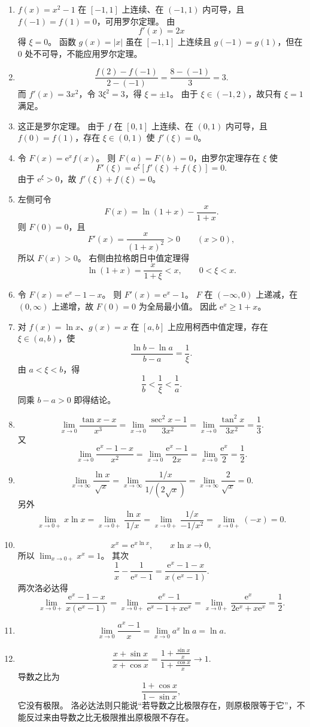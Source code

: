 \documentclass[fontset=fandol]{ctexart}
\newcommand{\ee}{\mathrm{e}}
\begin{document}
\begin{enumerate}[label=\textbf{练习\arabic*.},leftmargin=2.2em]
\item $f(x)=x^2-1$ 在 $[-1,1]$ 上连续、在 $(-1,1)$ 内可导，且 $f(-1)=f(1)=0$，可用罗尔定理。 由
\[
f'(x)=2x
\]
得 $\xi=0$。 函数 $g(x)=|x|$ 虽在 $[-1,1]$ 上连续且 $g(-1)=g(1)$，但在 $0$ 处不可导，不能应用罗尔定理。
\item
\[
\frac{f(2)-f(-1)}{2-(-1)}=\frac{8-(-1)}{3}=3.
\]
而 $f'(x)=3x^2$，令 $3\xi^2=3$，得 $\xi=\pm1$。 由于 $\xi\in(-1,2)$，故只有 $\xi=1$ 满足。
\item 这正是罗尔定理。 由于 $f$ 在 $[0,1]$ 上连续、在 $(0,1)$ 内可导，且 $f(0)=f(1)$，存在 $\xi\in(0,1)$ 使 $f'(\xi)=0$。
\item 令 $F(x)=\ee^x f(x)$。 则 $F(a)=F(b)=0$，由罗尔定理存在 $\xi$ 使
\[
F'(\xi)=\ee^\xi[f'(\xi)+f(\xi)]=0.
\]
由于 $\ee^\xi>0$，故 $f'(\xi)+f(\xi)=0$。
\item 左侧可令
\[
F(x)=\ln(1+x)-\frac{x}{1+x}.
\]
则 $F(0)=0$，且
\[
F'(x)=\frac{x}{(1+x)^2}>0\qquad(x>0),
\]
所以 $F(x)>0$。 右侧由拉格朗日中值定理得
\[
\ln(1+x)=\frac{x}{1+\xi}<x,\qquad 0<\xi<x.
\]
\item 令 $F(x)=\ee^x-1-x$。 则 $F'(x)=\ee^x-1$。 $F$ 在 $(-\infty,0)$ 上递减，在 $(0,\infty)$ 上递增，故 $F(0)=0$ 为全局最小值。 因此 $\ee^x\geq1+x$。
\item 对 $f(x)=\ln x$、$g(x)=x$ 在 $[a,b]$ 上应用柯西中值定理，存在 $\xi\in(a,b)$，使
\[
\frac{\ln b-\ln a}{b-a}=\frac1\xi.
\]
由 $a<\xi<b$，得
\[
\frac1b<\frac1\xi<\frac1a.
\]
同乘 $b-a>0$ 即得结论。
\item
\[
\lim_{x\to0}\frac{\tan x-x}{x^3}
=\lim_{x\to0}\frac{\sec^2x-1}{3x^2}
=\lim_{x\to0}\frac{\tan^2x}{3x^2}=\frac13.
\]
又
\[
\lim_{x\to0}\frac{\ee^x-1-x}{x^2}
=\lim_{x\to0}\frac{\ee^x-1}{2x}
=\lim_{x\to0}\frac{\ee^x}{2}=\frac12.
\]
\item
\[
\lim_{x\to\infty}\frac{\ln x}{\sqrt{x}}
=\lim_{x\to\infty}\frac{1/x}{1/(2\sqrt{x})}
=\lim_{x\to\infty}\frac{2}{\sqrt{x}}=0.
\]
另外
\[
\lim_{x\to0+}x\ln x
=\lim_{x\to0+}\frac{\ln x}{1/x}
=\lim_{x\to0+}\frac{1/x}{-1/x^2}
=\lim_{x\to0+}(-x)=0.
\]
\item
\[
x^x=\ee^{x\ln x},\qquad x\ln x\to0,
\]
所以 $\lim_{x\to0+}x^x=1$。 其次
\[
\frac1x-\frac1{\ee^x-1}
=\frac{\ee^x-1-x}{x(\ee^x-1)}.
\]
两次洛必达得
\[
\lim_{x\to0+}\frac{\ee^x-1-x}{x(\ee^x-1)}
=\lim_{x\to0+}\frac{\ee^x-1}{\ee^x-1+x\ee^x}
=\lim_{x\to0+}\frac{\ee^x}{2\ee^x+x\ee^x}
=\frac12.
\]
\item
\[
\lim_{x\to0}\frac{a^x-1}{x}
=\lim_{x\to0}a^x\ln a=\ln a.
\]
\item
\[
\frac{x+\sin x}{x+\cos x}
=\frac{1+\frac{\sin x}{x}}{1+\frac{\cos x}{x}}\to1.
\]
导数之比为
\[
\frac{1+\cos x}{1-\sin x},
\]
它没有极限。 洛必达法则只能说“若导数之比极限存在，则原极限等于它”，不能反过来由导数之比无极限推出原极限不存在。
\end{enumerate}
\end{document}
